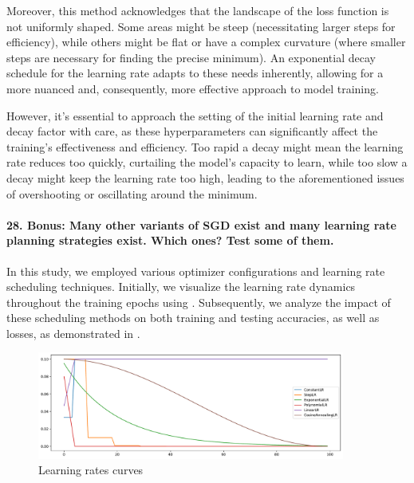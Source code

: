 Moreover, this method acknowledges that the landscape of the loss function is not uniformly shaped. Some areas might be steep (necessitating larger steps for efficiency), while others might be flat or have a complex curvature (where smaller steps are necessary for finding the precise minimum). An exponential decay schedule for the learning rate adapts to these needs inherently, allowing for a more nuanced and, consequently, more effective approach to model training.

However, it's essential to approach the setting of the initial learning rate and decay factor with care, as these hyperparameters can significantly affect the training's effectiveness and efficiency. Too rapid a decay might mean the learning rate reduces too quickly, curtailing the model's capacity to learn, while too slow a decay might keep the learning rate too high, leading to the aforementioned issues of overshooting or oscillating around the minimum.

\paragraph{28. Bonus: Many other variants of SGD exist and many learning rate planning strategies exist. Which ones? Test some of them.}

In this study, we employed various optimizer configurations and learning rate scheduling techniques. Initially, we visualize the learning rate dynamics throughout the training epochs using . Subsequently, we analyze the impact of these scheduling methods on both training and testing accuracies, as well as losses, as demonstrated in .

\begin{figure}[H]
    \centering
    \includegraphics*[width=0.9\textwidth]{figs/CNN/schedulers_comparison.pdf}
    \caption{Learning rates curves}
    \label{fig:schedulers_comparison}
\end{figure}

